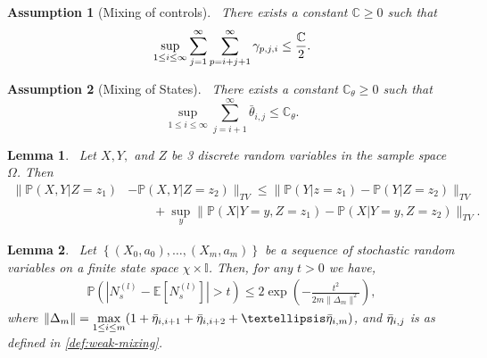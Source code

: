 \documentclass[10pt,a4paper]{amsart}
\newtheorem{assumption}{Assumption}
\newtheorem{lemma}{Lemma}
\newcommand{\Cbb}{\mathbb{C}}
\newcommand{\Ibb}{\mathbb{I}}
\newcommand{\Pbb}{\mathbb{P}}
\newcommand{\constant}{\Cbb}
\newcommand{\expec}{\mathbb{E}}
\newcommand{\indexeddata}{\left\{(X_0,a_0),\dots,(X_m,a_m)\right\}}
\newcommand{\pow}[1]{^{(#1)}}
\newcommand{\prob}{\Pbb}
\newcommand{\probl}{\prob}
\begin{document}
\begin{assumption}[Mixing of controls]~\label{assume:control-mixing} There exists a constant $\constant\geq 0$ such that
\begin{align*}
    \sup_{1\leq i\leq{\color{black} \infty}}\sum_{j=1}^{{\color{black} \infty}} \sum_{p=i+j+1}^{{\color{black} \infty}} \gamma_{p,j,i}\leq \frac{\constant}{2}.
\end{align*}

\end{assumption}

\begin{assumption}[Mixing of States]~\label{assume:chain-mix} There exists a constant $\constant_{\theta}\geq 0$ such that
\[
\sup_{1\leq i\leq { \infty}}\sum_{j=i+1}^{{ \infty}} \bar \theta_{i,j}\leq\constant_{\theta}. 
\]
\end{assumption}

\begin{lemma}~\label{lemma:tv-bound}
Let $X,Y,$ and $Z$ be 3 discrete random variables in the sample space $\Omega$. Then
    \begin{align*}
        \lVert \probl(X,Y|Z=z_1)& -\probl(X,Y|Z=z_2) \rVert_{TV} \leq \lVert \probl(Y|z=z_1)-\probl(Y|Z=z_2) \rVert_{TV}\\
        & \qquad +\sup_y\lVert \probl(X|Y=y,Z=z_1)-\probl(X|Y=y,Z=z_2) \rVert_{TV}.
    \end{align*}
\end{lemma}

\begin{lemma}~\label{lemma:kontorovich}
    Let $\indexeddata$ be a sequence of stochastic random variables on a finite state space $\chi\times\Ibb$. 
    Then, for any $t > 0$ we have,
  \begin{align}
      \prob(|N_s\pow{l}-\expec[N_s\pow{l}]|>t)\leq 2\exp\left(-\frac{t^2}{2m\|\Delta_m\|^2}\right),
  \end{align}
where $\|\Delta_m\|=\underset{1\leq i\leq m}{\max} (1+ \Bar{\eta}_{i,i+1}+ \Bar{\eta}_{i,i+2}+\dots \Bar{\eta}_{i,m})$, and $\Bar{\eta}_{i,j}$ is as defined in \cref{def:weak-mixing}.
\end{lemma}
\end{document}
